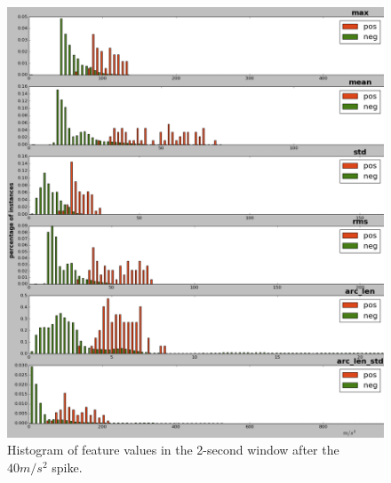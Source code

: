 \begin{figure}[t]
\begin{minipage}[t]{\columnwidth}
\includegraphics[width=\columnwidth]{hist_features_after_win_size_1_2.png}
\caption{Histogram of feature values in the 2-second window after the~$40 m/s^2$ spike.}
\label{fig:afterhist}
\end{minipage}
\end{figure}




